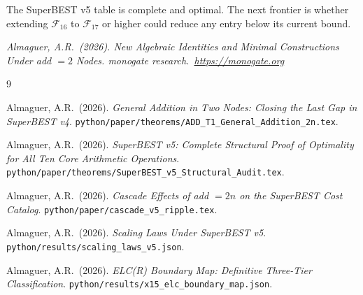 \documentclass[12pt,a4paper]{article}
\theoremstyle{definition}
\begin{document}
\noindent
The SuperBEST v5 table is complete and optimal.  The next frontier is whether
extending $\mathcal{F}_{16}$ to $\mathcal{F}_{17}$ or higher could reduce
any entry below its current bound.

\bigskip
\noindent\textit{Almaguer, A.R.\ (2026).
New Algebraic Identities and Minimal Constructions Under add $= 2$ Nodes.
monogate research.\ \url{https://monogate.org}}

\begin{thebibliography}{9}

Almaguer, A.R.\ (2026).
\textit{General Addition in Two Nodes: Closing the Last Gap in SuperBEST v4}.
\texttt{python/paper/theorems/ADD\_T1\_General\_Addition\_2n.tex}.

Almaguer, A.R.\ (2026).
\textit{SuperBEST v5: Complete Structural Proof of Optimality for All Ten Core
Arithmetic Operations}.
\texttt{python/paper/theorems/SuperBEST\_v5\_Structural\_Audit.tex}.

Almaguer, A.R.\ (2026).
\textit{Cascade Effects of add $= 2n$ on the SuperBEST Cost Catalog}.
\texttt{python/paper/cascade\_v5\_ripple.tex}.

Almaguer, A.R.\ (2026).
\textit{Scaling Laws Under SuperBEST v5}.
\texttt{python/results/scaling\_laws\_v5.json}.

Almaguer, A.R.\ (2026).
\textit{ELC(R) Boundary Map: Definitive Three-Tier Classification}.
\texttt{python/results/x15\_elc\_boundary\_map.json}.

\end{thebibliography}
\end{document}
